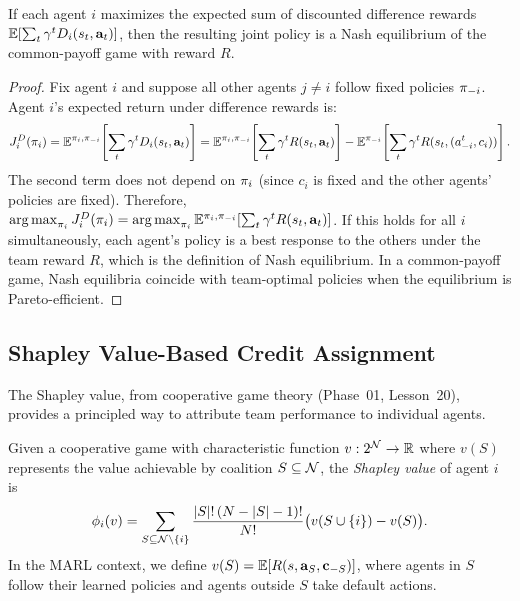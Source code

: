 \documentclass[11pt,a4paper]{article}
\begin{document}
\begin{proposition}
\label{prop:diff-alignment}
If each agent $i$ maximizes the expected sum of discounted
difference rewards $\mathbb{E}[\sum_t \gamma^t D_i(s_t, \mathbf{a}_t)]$,
then the resulting joint policy is a Nash equilibrium of the
common-payoff game with reward $R$.
\end{proposition}

\begin{proof}
Fix agent $i$ and suppose all other agents $j \neq i$ follow
fixed policies $\pi_{-i}$.  Agent $i$'s expected return under
difference rewards is:
\[
  J_i^D(\pi_i) = \mathbb{E}^{\pi_i, \pi_{-i}}\!\left[
    \sum_t \gamma^t D_i(s_t, \mathbf{a}_t)
  \right]
  = \mathbb{E}^{\pi_i, \pi_{-i}}\!\left[
    \sum_t \gamma^t R(s_t, \mathbf{a}_t)
  \right]
  - \mathbb{E}^{\pi_{-i}}\!\left[
    \sum_t \gamma^t R(s_t, (a_{-i}^t, c_i))
  \right].
\]
The second term does not depend on $\pi_i$ (since $c_i$ is
fixed and the other agents' policies are fixed).  Therefore,
$\operatorname{arg\,max}_{\pi_i} J_i^D(\pi_i) = \operatorname{arg\,max}_{\pi_i}
\mathbb{E}^{\pi_i, \pi_{-i}}[\sum_t \gamma^t R(s_t, \mathbf{a}_t)]$.
If this holds for all $i$ simultaneously, each agent's policy
is a best response to the others under the team reward $R$,
which is the definition of Nash equilibrium.  In a common-payoff
game, Nash equilibria coincide with team-optimal policies when
the equilibrium is Pareto-efficient.
\end{proof}

\subsection{Shapley Value-Based Credit Assignment}

The Shapley value, from cooperative game theory (Phase~01,
Lesson~20), provides a principled way to attribute team performance
to individual agents.

\begin{definition}
\label{def:shapley}
Given a cooperative game with characteristic function
$v : 2^{\mathcal{N}} \to \mathbb{R}$ where $v(S)$ represents the value
achievable by coalition $S \subseteq \mathcal{N}$, the
\emph{Shapley value} of agent $i$ is
\begin{equation}
\label{eq:shapley}
  \phi_i(v) = \sum_{S \subseteq \mathcal{N} \setminus \{i\}}
  \frac{|S|!\,(N - |S| - 1)!}{N!}
  \big(v(S \cup \{i\}) - v(S)\big).
\end{equation}
In the MARL context, we define $v(S) = \mathbb{E}[R(s, \mathbf{a}_S,
\mathbf{c}_{-S})]$, where agents in $S$ follow their learned
policies and agents outside $S$ take default actions.
\end{definition}
\end{document}
